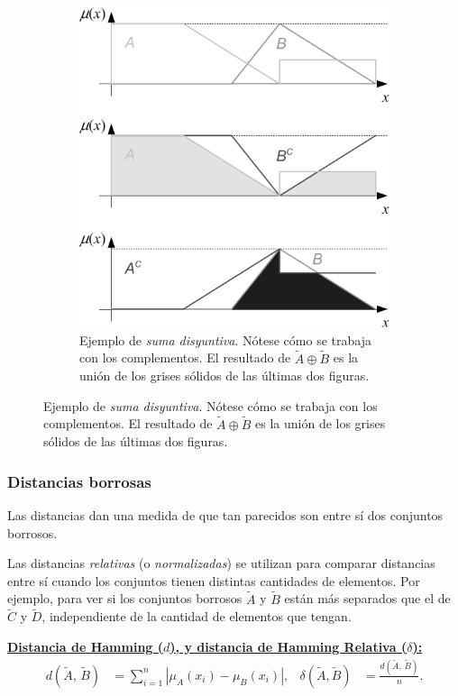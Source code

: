 \documentclass[10pt,a4paper]{article}
\begin{document}
\begin{figure}[ht!]
\begin{subfigure}[b]{0.4\textwidth}
				\includegraphics[width=\textwidth-\fboxrule-\fboxrule]{imgs/suma_disyuntiva.png}
                \caption{Ejemplo de \textit{suma disyuntiva}. Nótese cómo se trabaja con los complementos. El resultado de $\tilde{A} \oplus \tilde{B}$ es la unión de los grises sólidos de las últimas dos figuras.}
                \label{fig:suma_disyuntiva}
        \end{subfigure}
\end{figure}

\subsubsection{Distancias borrosas}

Las distancias dan una medida de que tan parecidos son entre sí dos conjuntos borrosos. 

Las distancias \textit{relativas} (o \textit{normalizadas}) se utilizan para comparar distancias entre sí cuando los conjuntos tienen distintas cantidades de elementos. Por ejemplo, para ver si los conjuntos borrosos $\tilde{A}$ y $\tilde{B}$ están más separados que el de $\tilde{C}$ y $\tilde{D}$, independiente de la cantidad de elementos que tengan.

\underline{\textbf{Distancia de Hamming ($d$), y distancia de Hamming Relativa ($\delta$):}}
\begin{align*}
d(\tilde{A}, \,\tilde{B}) &= \sum_{i=1}^n |\mu_A(x_i)-\mu_B(x_i)|,
&\delta(\tilde{A}, \tilde{B}) &= \frac{d(\tilde{A}, \,\tilde{B})}{n}.
\end{align*}
\end{document}
